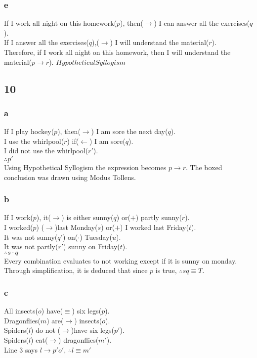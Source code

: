 \documentclass[journal]{IEEEtran}
\begin{document}
		\subsubsection{e}
		If I work all night on this homework($p$), then($\rightarrow$) I can answer all the exercises($q$). \\
		If I answer all the exercises($q$),($\rightarrow$) I will understand the material($r$). \\
		Therefore, if I work all night on this homework, then I will understand the
		material($\boxed{p \rightarrow r}$). $\boxed{Hypothetical Syllogism}$

	\subsection*{10}
		\subsubsection{a}
		 If I play hockey($p$), then($\rightarrow$) I am sore the next day($q$).  \\
		 I use the whirlpool($r$) if($\leftarrow$) I am sore($q$).  \\
		 I did not use the whirlpool($r'$).  \\ $\boxed{\therefore p'}$ \\
		 Using Hypothetical Syllogism the expression becomes $p \rightarrow r$.
		 The boxed conclusion was drawn using Modus Tollens.

		\subsubsection{b}
		 If I work($p$), it($\rightarrow$) is either sunny($q$) or($+$) partly sunny($r$). \\
		 I worked($p$) ($\rightarrow$)last Monday($s$) or($+$) I worked last Friday($t$).   \\
		 It was not sunny($q'$) on($\cdot$) Tuesday($u$).   \\
		 It was not partly($r'$) sunny on Friday($t$).\\ $\boxed{\therefore s \cdot q}$ \\
		 Every combination evaluates to not working except if it is sunny on monday.
		 Through simplification, it is deduced that since $p$ is true, $\therefore sq \equiv T$.

		\subsubsection{c}
		 All insects($o$) have($\equiv$) six legs($p$).   \\
		 Dragonflies($m$) are($\rightarrow$) insects($o$). \\
		 Spiders($l$) do not ($\rightarrow$)have six legs($p'$).   \\
		 Spiders($l$) eat($\rightarrow$) dragonflies($m'$). \\
		 Line 3 says $l \rightarrow p'o'$, $\boxed{\therefore l \equiv m'}$
\end{document}
